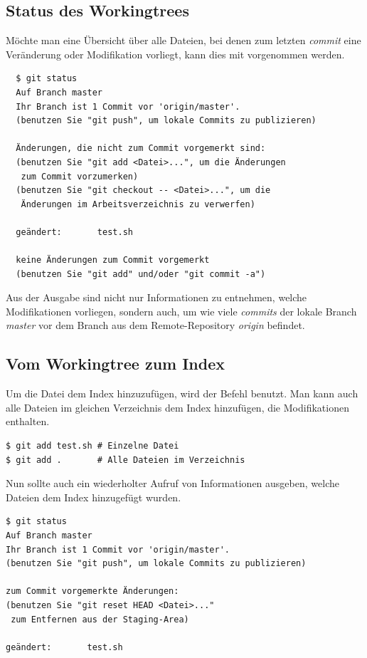 \subsection{Status des Workingtrees}
\label{sec:work-with-git.workingtree-status}
Möchte man eine Übersicht über alle Dateien, bei denen zum letzten \textit{commit} eine Veränderung oder Modifikation vorliegt, kann dies mit \textit{} vorgenommen werden.

\begin{verbatim}
  $ git status
  Auf Branch master
  Ihr Branch ist 1 Commit vor 'origin/master'.
  (benutzen Sie "git push", um lokale Commits zu publizieren)
  
  Änderungen, die nicht zum Commit vorgemerkt sind:
  (benutzen Sie "git add <Datei>...", um die Änderungen 
   zum Commit vorzumerken)
  (benutzen Sie "git checkout -- <Datei>...", um die 
   Änderungen im Arbeitsverzeichnis zu verwerfen)
  
  geändert:       test.sh
  
  keine Änderungen zum Commit vorgemerkt 
  (benutzen Sie "git add" und/oder "git commit -a")
\end{verbatim}

Aus der Ausgabe sind nicht nur Informationen zu entnehmen, welche Modifikationen vorliegen, sondern auch, um wie viele \textit{commits} der lokale Branch \textit{master} vor dem Branch  aus dem Remote-Repository \textit{origin} befindet.

\subsection{Vom Workingtree zum Index}
\label{sec:work-with-git.workingtree-to-index}
Um die Datei dem Index hinzuzufügen, wird der Befehl \textit{} benutzt. Man kann auch alle Dateien im gleichen Verzeichnis dem Index hinzufügen, die Modifikationen enthalten.

\begin{verbatim}
$ git add test.sh # Einzelne Datei
$ git add .       # Alle Dateien im Verzeichnis 
\end{verbatim}

Nun sollte auch ein wiederholter Aufruf von \textit{} Informationen ausgeben, welche Dateien dem Index hinzugefügt wurden.

\begin{verbatim}
$ git status
Auf Branch master
Ihr Branch ist 1 Commit vor 'origin/master'.
(benutzen Sie "git push", um lokale Commits zu publizieren)

zum Commit vorgemerkte Änderungen:
(benutzen Sie "git reset HEAD <Datei>..." 
 zum Entfernen aus der Staging-Area)

geändert:       test.sh
\end{verbatim}


